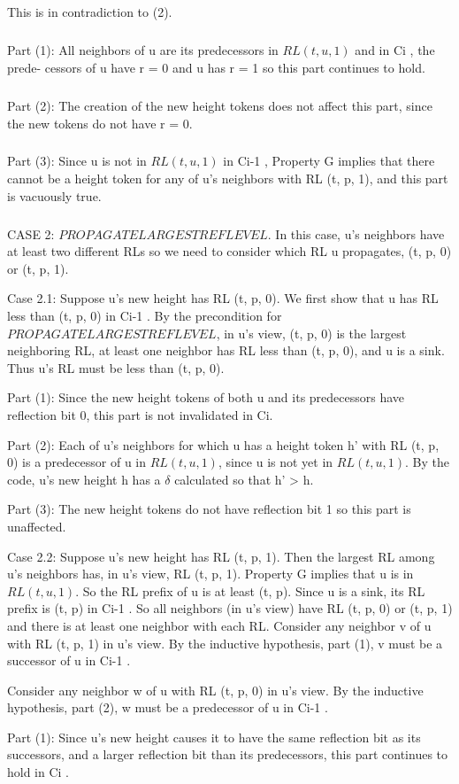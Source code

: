 \subparagraph{}This is in contradiction to (2).
\subparagraph{}Part (1): All neighbors of u are its predecessors in $RL (t, u, 1)$ and in Ci , the prede- cessors of u have r = 0 and u has r = 1 so this part continues to hold.
\subparagraph{}Part (2): The creation of the new height tokens does not affect this part, since the new tokens do not have r = 0.
\subparagraph{}Part (3): Since u is not in $RL (t, u, 1)$ in Ci-1 , Property G implies that there cannot be a height token for any of u's neighbors with RL (t, p, 1), and this part is vacuously true.
\subparagraph{}CASE 2: $PROPAGATELARGESTREFLEVEL$. In this case, u's neighbors have at least two different RLs so we need to consider which RL u propagates, (t, p, 0) or (t, p, 1).

Case 2.1: Suppose u's new height has RL (t, p, 0). We first show that u has RL less than (t, p, 0) in Ci-1 . By the precondition for $PROPAGATELARGESTREFLEVEL$, in u's view, (t, p, 0) is the largest neighboring RL, at least one neighbor has RL less than (t, p, 0), and u is a sink. Thus u's RL must be less than (t, p, 0).

Part (1): Since the new height tokens of both u and its predecessors have reflection bit 0, this part is not invalidated in Ci.

Part (2): Each of u's neighbors for which u has a height token h' with RL (t, p, 0) is a predecessor of u in $RL (t, u, 1)$, since u is not yet in $RL (t, u, 1)$. By the code, u's new height h has a $\delta$ calculated so that h' > h.

Part (3): The new height tokens do not have reflection bit 1 so this part is unaffected.

Case 2.2: Suppose u's new height has RL (t, p, 1). Then the largest RL among u's neighbors has, in u's view, RL (t, p, 1). Property G implies that u is in $RL (t, u, 1)$. So the RL prefix of u is at least (t, p). Since u is a sink, its RL prefix is (t, p) in Ci-1 . So all neighbors (in u's view) have RL (t, p, 0) or (t, p, 1) and there is at least one neighbor with each RL. Consider any neighbor v of u with RL (t, p, 1) in u's view. By the inductive hypothesis, part (1), v must be a successor of u in Ci-1 .

Consider any neighbor w of u with RL (t, p, 0) in u's view. By the inductive hypothesis, part (2), w must be a predecessor of u in Ci-1 .

Part (1): Since u's new height causes it to have the same reflection bit as its successors, and a larger reflection bit than its predecessors, this part continues to hold in Ci .

